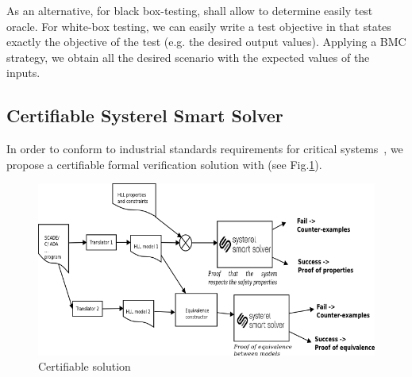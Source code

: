 As an alternative, for black box-testing, \smartsolver{} shall allow to determine easily test oracle.
For white-box testing, we can easily write a test objective in \HLL{} that
states exactly the objective of the test (e.g. the desired output values). Applying a BMC strategy, we obtain all the desired scenario with the expected values of the inputs.


\subsection{Certifiable Systerel Smart Solver}
\label{cs3}

In order to conform to industrial standards  requirements for critical systems~\cite{standard_railway_2011,standard_aerospace_2011}, we propose a certifiable formal verification solution with  \smartsolver{} (see Fig.\ref{fig:s3-certif-check}).


\begin{figure}[h]
  \centering
  \includegraphics[width=1\textwidth]{figures/s3certif}
  \caption{Certifiable solution}
  \label{fig:s3-certif-check}
\end{figure}

